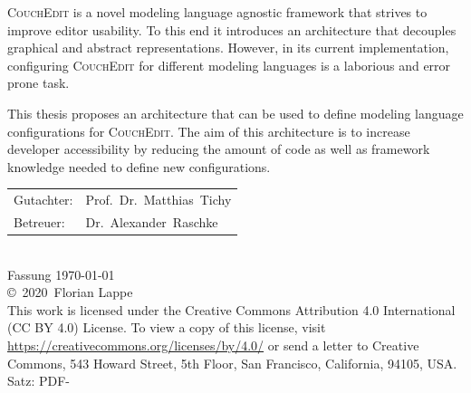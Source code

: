 \documentclass[
a4paper,
numbers=noenddot,      %
bibliography=totoc,              %
BCOR=15mm,               %
leqno					%
]{scrbook}
\newcommand{\fullname}{Florian Lappe}
\newcommand{\jahr}{2020}
\newcommand{\gutachterA}{Prof.\ Dr.\ Matthias\ Tichy}
\newcommand{\betreuer}{Dr.\ Alexander\ Raschke}
\begin{document}
\textsc{CouchEdit} is a novel modeling language agnostic framework that strives to improve editor usability. To this end it introduces an architecture that decouples graphical and abstract representations. However, in its current implementation, configuring \textsc{CouchEdit} for different modeling languages is a laborious and error prone task.

This thesis proposes an architecture that can be used to define modeling language configurations for \textsc{CouchEdit}. The aim of this architecture is to increase developer accessibility by reducing the amount of code as well as framework knowledge needed to define new configurations. 

  {
    \null
    \small
    \vfill
    \begin{center}
      \begin{tabular}{l l}
        Gutachter: & \gutachterA \\
        Betreuer:  & \betreuer   \\
      \end{tabular}\\[1cm]
      Fassung \today\\
      \copyright~\jahr~\fullname\\[0.5em]
      This work is licensed under the Creative Commons Attribution 4.0 International (CC BY 4.0) License. To view a copy of this license, visit \href{https://creativecommons.org/licenses/by/4.0/}{https://creativecommons.org/licenses/by/4.0/} or send a letter to Creative Commons, 543 Howard Street, 5th Floor, San Francisco, California, 94105, USA. \\

      Satz: PDF-\LaTeXe
    \end{center}
  }


\tableofcontents

\mainmatter %









\end{document}
